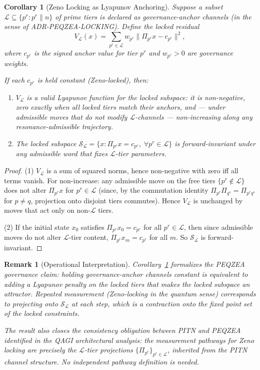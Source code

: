 \documentclass[11pt]{amsart}
\newtheorem{corollary}[theorem]{Corollary}
\newtheorem{remark}[theorem]{Remark}
\newcommand{\Prj}{\Pi}
\newcommand{\norm}[1]{\lVert #1 \rVert}
\begin{document}
\begin{corollary}[Zeno Locking as Lyapunov Anchoring]\label{cor:zeno}
Suppose a subset $\mathcal{L} \subseteq \{p^r : p^r \| n\}$ of prime tiers is declared as \emph{governance-anchor channels} (in the sense of ADR-PEQZEA-LOCKING). Define the \emph{locked residual}
\[
  V_{\mathcal{L}}(x) = \sum_{p^r \in \mathcal{L}} w_{p^r} \norm{\Prj_{p^r} x - c_{p^r}}^2,
\]
where $c_{p^r}$ is the signed anchor value for tier $p^r$ and $w_{p^r} > 0$ are governance weights.

If each $c_{p^r}$ is held constant (Zeno-locked), then:
\begin{enumerate}
  \item $V_{\mathcal{L}}$ is a valid Lyapunov function for the locked subspace: it is non-negative, zero exactly when all locked tiers match their anchors, and — under admissible moves that do not modify $\mathcal{L}$-channels — non-increasing along any resonance-admissible trajectory.
  \item The locked subspace $\mathcal{S}_{\mathcal{L}} = \{x : \Prj_{p^r} x = c_{p^r},\; \forall p^r \in \mathcal{L}\}$ is forward-invariant under any admissible word that fixes $\mathcal{L}$-tier parameters.
\end{enumerate}
\end{corollary}

\begin{proof}
(1) $V_{\mathcal{L}}$ is a sum of squared norms, hence non-negative with zero iff all terms vanish. For non-increase: any admissible move on the free tiers $\{p^r \notin \mathcal{L}\}$ does not alter $\Prj_{p^r} x$ for $p^r \in \mathcal{L}$ (since, by the commutation identity $\Prj_{p^r}\Prj_{q^s} = \Prj_{p^r q^s}$ for $p \neq q$, projection onto disjoint tiers commutes). Hence $V_{\mathcal{L}}$ is unchanged by moves that act only on non-$\mathcal{L}$ tiers.

(2) If the initial state $x_0$ satisfies $\Prj_{p^r} x_0 = c_{p^r}$ for all $p^r \in \mathcal{L}$, then since admissible moves do not alter $\mathcal{L}$-tier content, $\Prj_{p^r} x_m = c_{p^r}$ for all $m$. So $\mathcal{S}_{\mathcal{L}}$ is forward-invariant.
\end{proof}

\begin{remark}[Operational Interpretation]
Corollary~\ref{cor:zeno} formalizes the PEQZEA governance claim: holding governance-anchor channels constant is equivalent to adding a Lyapunov penalty on the locked tiers that makes the locked subspace an attractor. Repeated measurement (Zeno-locking in the quantum sense) corresponds to projecting onto $\mathcal{S}_{\mathcal{L}}$ at each step, which is a contraction onto the fixed point set of the locked constraints.

The result also closes the consistency obligation between PITN and PEQZEA identified in the QAGI architectural analysis: the measurement pathways for Zeno locking are precisely the $\mathcal{L}$-tier projections $\{\Prj_{p^r}\}_{p^r \in \mathcal{L}}$, inherited from the PITN channel structure. No independent pathway definition is needed.
\end{remark}
\end{document}
